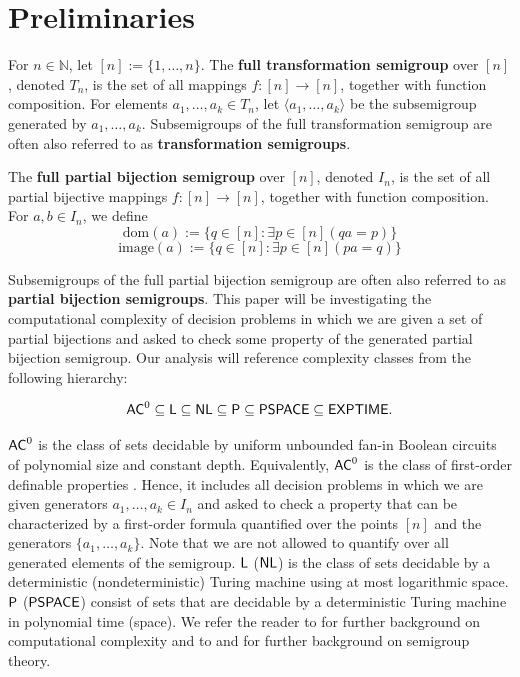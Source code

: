 \documentclass{amsart}
\newcommand{\dom}{\mathrm{dom}}
\newcommand{\image}{\mathrm{image}}
\newcommand{\NL}{\ensuremath\mathsf{NL}}
\newcommand{\PSPACE}{\ensuremath\mathsf{PSPACE}}
\newcommand{\EXPTIME}{\ensuremath\mathsf{EXPTIME}}
\newcommand{\AC}{\ensuremath\mathsf{AC}}
\newcommand{\LOGSPACE}{\ensuremath\mathsf{L}}
\newcommand{\Poly}{\ensuremath\mathsf{P}}
\theoremstyle{remark}
\numberwithin{equation}{section}
\begin{document}
\section{Preliminaries} \label{NotationSection}

For $n \in \mathbb{N}$, let $[n] := \{1,\dots,n\}$. The {\bf full transformation semigroup} over $[n]$, denoted $T_n$, is the set of all mappings $f \colon [n] \to [n]$, together with function composition. For elements $a_1,\dots,a_k \in T_n$, let $\langle a_1,\dots,a_k\rangle$ be the subsemigroup generated by $a_1,\dots,a_k$. Subsemigroups of the full transformation semigroup are often also referred to as {\bf transformation semigroups}.

The {\bf full partial bijection semigroup} over $[n]$, denoted $I_n$, is the set of all partial bijective mappings $f \colon [n] \to [n]$, together with function composition. For $a,b \in I_n$, we define
\[ \dom(a) := \{q \in [n]: \exists p \in [n](qa = p)\} \]
\[\image(a) := \{q \in [n] : \exists p \in [n] (pa = q)\}\]

Subsemigroups of the full partial bijection semigroup are often also referred to as {\bf partial bijection semigroups}. This paper will be investigating the computational complexity of decision problems in which we are given a set of partial bijections and asked to check some property of the generated partial bijection semigroup. Our analysis will reference complexity classes from the following hierarchy:

$$ \AC^0 \subseteq \LOGSPACE \subseteq \NL \subseteq \Poly \subseteq \PSPACE \subseteq \EXPTIME.$$

$\AC^0$ is the class of sets decidable by uniform unbounded fan-in Boolean circuits of polynomial size and constant depth. Equivalently, $\AC^0$ is the class of first-order definable properties \cite{IM:DC}. Hence, it includes all decision problems in which we are given generators $a_1,\dots,a_k \in I_n$ and asked to check a property that can be characterized by a first-order formula quantified over the points $[n]$ and the generators $\{a_1,\dots,a_k\}$. Note that we are not allowed to quantify over all generated elements of the semigroup. $\LOGSPACE$ ($\NL$) is the class of sets decidable by a deterministic (nondeterministic) Turing machine using at most logarithmic space. $\Poly$ ($\PSPACE$) consist of sets that are decidable by a deterministic Turing machine in polynomial time (space). We refer the reader to \cite{PA:CC} for further background on computational complexity and to \cite{CP:AT} and \cite{HO:FST} for further background on semigroup theory.
\end{document}

